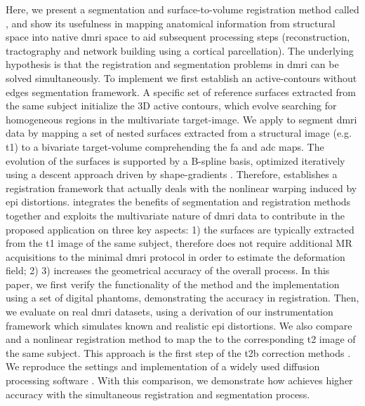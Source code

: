 Here, we present a segmentation and surface-to-volume registration method
  called \regseg{}, and show its usefulness in mapping anatomical information from structural
  space into native \gls*{dmri} space to aid subsequent processing steps
  (reconstruction, tractography and network building using a cortical parcellation).
The underlying hypothesis is that the registration and segmentation problems
  in \gls*{dmri} can be solved simultaneously.
To implement \regseg{} we first establish an active-contours without edges
  \citep{chan_active_2001} segmentation framework.
A specific set of reference surfaces extracted from the same subject initialize
  the 3D active contours, which evolve searching for homogeneous regions in the multivariate
  target-image.
We apply \regseg{} to segment \gls*{dmri} data by mapping
  a set of nested surfaces extracted from a structural image (e.g. \gls*{t1}) to
  a bivariate target-volume comprehending the \gls*{fa} and \gls*{adc} maps.
The evolution of the surfaces is supported by a B-spline basis, optimized
  iteratively using a descent approach driven by shape-gradients
  \citep{besson_dream2s_2003,herbulot_segmentation_2006}.
Therefore, \regseg{} establishes a registration framework that actually
  deals with the nonlinear warping induced by \gls*{epi} distortions.
\Regseg{} integrates the benefits of segmentation and registration methods together and
  exploits the multivariate nature of \gls*{dmri} data to contribute in the proposed
  application on three key aspects:
  1) the surfaces are typically extracted from the \gls*{t1} image of the same subject,
    therefore \regseg{} does not require additional MR acquisitions to the minimal
    \gls*{dmri} protocol in order to estimate the deformation field;
  2)  
  3) \regseg{} increases the geometrical accuracy of the overall process.
In this paper, we first verify the functionality of the method and the \regseg{}
  implementation using a set of digital phantoms, demonstrating the
   accuracy in registration.
Then, we evaluate \regseg{} on real \gls*{dmri} datasets, using a derivation of our
  instrumentation framework \citep{esteban_simulationbased_2014} which simulates
  known and realistic \gls*{epi} distortions.
We also compare \regseg{} and a nonlinear registration method to map the \lowb{} to
  the corresponding \gls*{t2} image of the same subject.
This approach is the first step of the \gls*{t2b} correction
  methods \citep{kybic_unwarping_2000}.
We reproduce the settings and implementation of a widely used diffusion
  processing software \citep[\emph{ExploreDTI},][]{leemans_exploredti_2009}.
With this comparison, we demonstrate how \regseg{} achieves higher accuracy with the
  simultaneous registration and segmentation process.